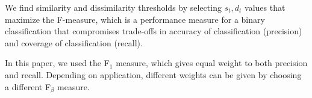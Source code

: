 %
%
%
%
%
% 

We find similarity and dissimilarity thresholds by selecting $s_t,d_t$ values that maximize the F-measure,
which is a performance measure for a binary classification that compromises trade-offs in accuracy of classification (precision) and coverage of classification (recall).

In this paper, we used the F$_1$ measure, which gives equal weight to both precision and recall.
Depending on application, different weights can be given by choosing a different F$_\beta$ measure.



